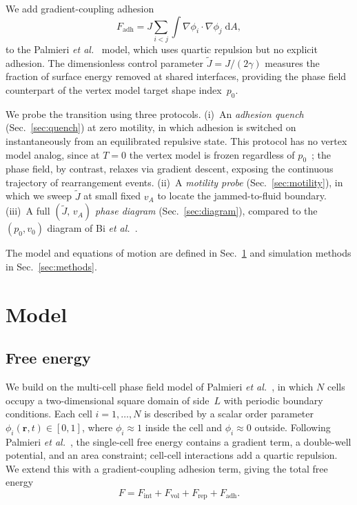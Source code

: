 \documentclass[aps,pre,twocolumn,superscriptaddress,longbibliography,floatfix]{revtex4-2}
\newcommand{\dd}{\mathrm{d}}               %
\newcommand{\vA}{v_{\!A}}                  %
\newcommand{\Jt}{\tilde{J}}               %
\newcommand{\phii}{\phi_i}                 %
\newcommand{\phij}{\phi_j}                 %
\begin{document}
We add gradient-coupling adhesion
%
\begin{equation}
  F_{\mathrm{adh}} = J\sum_{i<j}\int \nabla\phii\cdot\nabla\phij\;\dd A,
  \label{eq:adhesion-intro}
\end{equation}
%
to the Palmieri \textit{et al.}~\cite{Palmieri2015} model, which uses
quartic repulsion but no explicit adhesion.  The dimensionless
control parameter $\Jt = J/(2\gamma)$ measures the fraction of surface
energy removed at shared interfaces, providing the phase field
counterpart of the vertex model target shape index~$p_0$.

We probe the transition using three protocols.
(i)~An \emph{adhesion quench} (Sec.~\ref{sec:quench}) at zero motility,
in which adhesion is switched on instantaneously from an equilibrated
repulsive state.  This protocol has no vertex model analog, since at
$T = 0$ the vertex model is frozen regardless of
$p_0$~\cite{Bi2015}; the phase field, by contrast, relaxes via gradient
descent, exposing the continuous trajectory of rearrangement events.
(ii)~A \emph{motility probe} (Sec.~\ref{sec:motility}), in which we sweep
$\Jt$ at small fixed $\vA$ to locate the jammed-to-fluid boundary.
(iii)~A full \emph{$(\Jt,\,\vA)$ phase diagram}
(Sec.~\ref{sec:diagram}), compared to the $(p_0, v_0)$ diagram of
Bi \textit{et al.}~\cite{Bi2016}.

The model and equations of motion are defined in Sec.~\ref{sec:model}
and simulation methods in Sec.~\ref{sec:methods}.


\section{Model}
\label{sec:model}

\subsection{Free energy}
\label{sec:model:energy}

We build on the multi-cell phase field model of Palmieri
\textit{et al.}~\cite{Palmieri2015}, in which $N$ cells occupy a
two-dimensional square domain of side~$L$ with periodic boundary conditions.
Each cell $i = 1,\dots,N$ is described by a scalar order parameter
$\phii(\bm{r},t) \in [0,1]$, where $\phii \approx 1$ inside the cell and
$\phii \approx 0$ outside.  Following Palmieri
\textit{et al.}~\cite{Palmieri2015}, the single-cell free energy contains
a gradient term, a double-well potential, and an area constraint;
cell-cell interactions add a quartic repulsion.  We extend this with
a gradient-coupling adhesion term, giving the total free energy
%
\begin{equation}
  F = F_{\mathrm{int}} + F_{\mathrm{vol}} + F_{\mathrm{rep}} + F_{\mathrm{adh}}.
  \label{eq:free-energy}
\end{equation}
\end{document}
